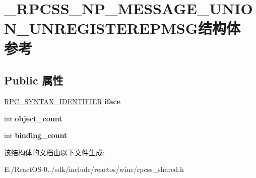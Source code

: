 \hypertarget{struct___r_p_c_s_s___n_p___m_e_s_s_a_g_e___u_n_i_o_n___u_n_r_e_g_i_s_t_e_r_e_p_m_s_g}{}\section{\+\_\+\+R\+P\+C\+S\+S\+\_\+\+N\+P\+\_\+\+M\+E\+S\+S\+A\+G\+E\+\_\+\+U\+N\+I\+O\+N\+\_\+\+U\+N\+R\+E\+G\+I\+S\+T\+E\+R\+E\+P\+M\+S\+G结构体 参考}
\label{struct___r_p_c_s_s___n_p___m_e_s_s_a_g_e___u_n_i_o_n___u_n_r_e_g_i_s_t_e_r_e_p_m_s_g}
\subsection*{Public 属性}
\begin{DoxyCompactItemize}
\item 
\mbox{\label{struct___r_p_c_s_s___n_p___m_e_s_s_a_g_e___u_n_i_o_n___u_n_r_e_g_i_s_t_e_r_e_p_m_s_g_ae35373b8962f8788f1c9b342ea2f4ccd}} 
\hyperlink{struct___r_p_c___s_y_n_t_a_x___i_d_e_n_t_i_f_i_e_r}{R\+P\+C\+\_\+\+S\+Y\+N\+T\+A\+X\+\_\+\+I\+D\+E\+N\+T\+I\+F\+I\+ER} {\bfseries iface}
\item 
\mbox{\label{struct___r_p_c_s_s___n_p___m_e_s_s_a_g_e___u_n_i_o_n___u_n_r_e_g_i_s_t_e_r_e_p_m_s_g_a3eb618c0d9f68610cb04b7f84a46dc35}} 
int {\bfseries object\+\_\+count}
\item 
\mbox{\label{struct___r_p_c_s_s___n_p___m_e_s_s_a_g_e___u_n_i_o_n___u_n_r_e_g_i_s_t_e_r_e_p_m_s_g_a65fad79a3de812a3008a7d8e0633fe4d}} 
int {\bfseries binding\+\_\+count}
\end{DoxyCompactItemize}


该结构体的文档由以下文件生成\+:\begin{DoxyCompactItemize}
\item 
E\+:/\+React\+O\+S-\/0../sdk/include/reactos/wine/rpcss\+\_\+shared.\+h\end{DoxyCompactItemize}

